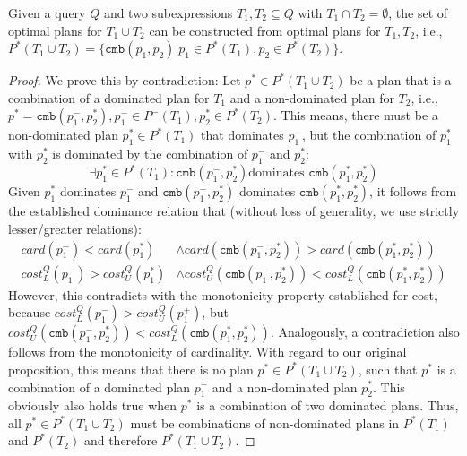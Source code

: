 \begin{theorem}
  Given a query $Q$ and two subexpressions $T_1,T_2 \subseteq Q$ with
  $T_1 \cap T_2 = \emptyset$, the set of optimal plans for $T_1 \cup
  T_2$ can be constructed from optimal plans for $T_1,T_2$, i.e.,
  $P^*(T_1 \cup T_2) =
  \{\mathtt{cmb}(p_1,p_2) | p_1 \in P^*(T_1), p_2 \in P^*(T_2)\}$.
\end{theorem}
\begin{proof}
  We prove this by contradiction: Let $p^* \in P^*(T_1 \cup T_2)$ be a plan that is a combination of a
  dominated plan for $T_1$ and a non-dominated plan for $T_2$, i.e.,
  $p^* = \mathtt{cmb}(p^-_1,p^*_2),p^-_1 \in P^-(T_1),p^*_2 \in
  P^*(T_2)$. This means, there must be a non-dominated plan $p^*_1 \in
  P^*(T_1)$ that dominates $p^-_1$, but the combination of $p^*_1$
  with $p^*_2$ is dominated by the combination of $p^-_1$ and $p^*_2$:
  \[ \exists p^*_1 \in P^*(T_1) : \mathtt{cmb}(p^-_1,p^*_2) \text{
    dominates } \mathtt{cmb}(p^*_1,p^*_2)\] Given $p^*_1$ dominates
  $p^-_1$ and $\mathtt{cmb}(p^-_1,p^*_2)$ dominates
  $\mathtt{cmb}(p^*_1,p^*_2)$, it follows from the established dominance relation that
  (without loss of generality, we use strictly lesser/greater relations):
  \begin{align*}
    card(p^-_1) < card(p^*_1) & \wedge card(\mathtt{cmb}(p^-_1,p^*_2)) > card(\mathtt{cmb}(p^*_1,p^*_2)) \\
    cost^Q_L(p^-_1) > cost^Q_U(p^*_1) & \wedge
    cost^Q_U(\mathtt{cmb}(p^-_1,p^*_2)) <
    cost^Q_L(\mathtt{cmb}(p^*_1,p^*_2))  
  \end{align*}
  However, this contradicts with the monotonicity property established for cost, because $cost^Q_L(p^-_1) >
  cost^Q_U(p^+_1)$, but $cost^Q_U(\mathtt{cmb}(p^-_1,p^*_2)) <
  cost^Q_L(\mathtt{cmb}(p^*_1,p^*_2))$. Analogously, a contradiction also follows from the monotonicity of cardinality. With regard to our original proposition, this means
  that there is no plan $p^* \in P^*(T_1 \cup T_2)$, such that $p^*$
  is a combination of a dominated plan $p^-_1$ and a non-dominated plan
  $p^*_2$. This obviously also holds true when $p^*$ is a combination of two dominated
  plans. Thus, all
  $p^* \in P^*(T_1 \cup T_2)$ must be combinations of non-dominated
  plans in $P^*(T_1)$ and $P^*(T_2)$ and therefore $P^*(T_1 \cup T_2)$.
\end{proof}


